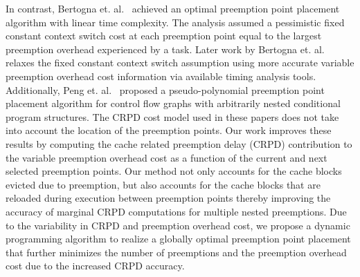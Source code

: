 \indent
In contrast, Bertogna et. al.~\cite{bertogna:10} achieved an optimal preemption point placement algorithm with linear time complexity.  The analysis assumed a pessimistic fixed constant context switch cost at each preemption point equal to the largest preemption overhead experienced by a task.  Later work by Bertogna et. al.~\cite{bertogna:11} relaxes the fixed constant context switch assumption using more accurate variable preemption overhead cost information via available timing analysis tools.  Additionally, Peng et. al.~\cite{peng:14} proposed a pseudo-polynomial preemption point placement algorithm for control flow graphs with arbitrarily nested conditional program structures.  The CRPD cost model used in these papers does not take into account the location of the preemption points.
\newline
\indent
Our work improves these results by computing the cache related preemption delay (CRPD) contribution to the variable preemption overhead cost as a function of the current and next selected preemption points.  Our method not only accounts for the cache blocks evicted due to preemption, but also accounts for the cache blocks that are reloaded during execution between preemption points thereby improving the accuracy of marginal CRPD computations for multiple nested preemptions.  
\newline
\indent
Due to the variability in CRPD and preemption overhead cost, we propose a dynamic programming algorithm to realize a globally optimal preemption point placement that further minimizes the number of preemptions and the preemption overhead cost due to the increased CRPD accuracy.
